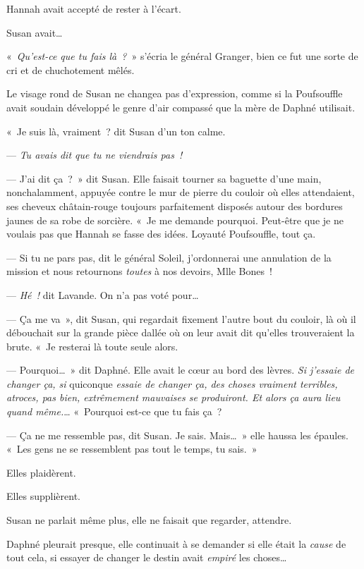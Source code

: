 Hannah avait accepté de rester à l'écart.

Susan avait…

\later

«~\emph{Qu'est-ce que tu fais là~?}~» s'écria le général Granger, bien ce fut une sorte de cri et de chuchotement mêlés.

Le visage rond de Susan ne changea pas d'expression, comme si la Poufsouffle avait soudain développé le genre d'air compassé que la mère de Daphné utilisait.

«~Je suis là, vraiment~? dit Susan d'un ton calme.

--- \emph{Tu avais dit que tu ne viendrais pas~!}

--- J'ai dit ça~?~»
dit Susan.
Elle faisait tourner sa baguette d'une main, nonchalamment, appuyée contre le mur de pierre du couloir où elles attendaient, ses cheveux châtain-rouge toujours parfaitement disposés autour des bordures jaunes de sa robe de sorcière.
«~Je me demande pourquoi.
Peut-être que je ne voulais pas que Hannah se fasse des idées.
Loyauté Poufsouffle, tout ça.

--- Si tu ne pars pas, dit le général Soleil, j'ordonnerai une annulation de la mission et nous retournons \emph{toutes} à nos devoirs, Mlle Bones~!

--- \emph{Hé~!} dit Lavande.
On n'a pas voté pour…

--- Ça me va~», dit Susan, qui regardait fixement l'autre bout du couloir, là où il débouchait sur la grande pièce dallée où on leur avait dit qu'elles trouveraient la brute.
«~Je resterai là toute seule alors.

--- Pourquoi…~»
dit Daphné.
Elle avait le cœur au bord des lèvres.
\emph{Si j'essaie de changer ça, si} quiconque \emph{essaie de changer ça, des choses vraiment terribles, atroces, pas bien, extrêmement mauvaises se produiront.
Et alors ça aura lieu quand même.}…
«~Pourquoi est-ce que tu fais ça~?

--- Ça ne me ressemble pas, dit Susan.
Je sais.
Mais…~» elle haussa les épaules.
«~Les gens ne se ressemblent pas tout le temps, tu sais.~»

Elles plaidèrent.

Elles supplièrent.

Susan ne parlait même plus, elle ne faisait que regarder, attendre.

Daphné pleurait presque, elle continuait à se demander si elle était la \emph{cause} de tout cela, si essayer de changer le destin avait \emph{empiré} les choses…

